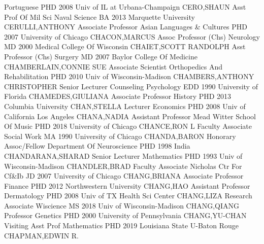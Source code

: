 \documentclass[
]{article}
\begin{document}
Portuguese \textbar{}  \textbar PHD 2008 Univ of IL at
Urbana-Champaign \textbar CERO,SHAUN \textbar Asst Prof Of Mil Sci
\textbar Naval Science \textbar{}  \textbar BA 2013 Marquette
University \textbar CERULLI,ANTHONY \textbar Associate Professor
\textbar Asian Languages \& Cultures \textbar{}  \textbar PHD
2007 University of Chicago \textbar CHACON,MARCUS \textbar Assoc
Professor (Chs) \textbar Neurology \textbar{}  \textbar MD
2000 Medical College Of Wisconsin \textbar CHAIET,SCOTT RANDOLPH
\textbar Asst Professor (Chs) \textbar Surgery \textbar{} 
\textbar MD 2007 Baylor College Of Medicine \textbar CHAMBERLAIN,CONNIE
SUE \textbar Associate Scientist \textbar Orthopedics And Rehabilitation
\textbar{}  \textbar PHD 2010 Univ of Wisconsin-Madison
\textbar CHAMBERS,ANTHONY CHRISTOPHER \textbar Senior Lecturer
\textbar Counseling Psychology \textbar{}  \textbar EDD 1990
University of Florida \textbar CHAMEDES,GIULIANA \textbar Associate
Professor \textbar History \textbar{}  \textbar PHD 2013
Columbia University \textbar CHAN,STELLA \textbar Lecturer
\textbar Economics \textbar{}  \textbar PHD 2008 Univ of
California Los Angeles \textbar CHANA,NADIA \textbar Assistant Professor
\textbar Mead Witter School Of Music \textbar{}  \textbar PHD
2018 University of Chicago \textbar CHANCE,RON L \textbar Faculty
Associate \textbar Social Work \textbar{}  \textbar MA 1990
University of Chicago \textbar CHANDA,BARON \textbar Honorary
Assoc/Fellow \textbar Department Of Neuroscience \textbar{} 
\textbar PHD 1998 India \textbar CHANDARANA,SHARAD \textbar Senior
Lecturer \textbar Mathematics \textbar{}  \textbar PHD 1993
Univ of Wisconsin-Madison \textbar CHANDLER,BRAD \textbar Faculty
Associate \textbar Nicholas Ctr For Cf\&Ib \textbar{} 
\textbar JD 2007 University of Chicago \textbar CHANG,BRIANA
\textbar Associate Professor \textbar Finance \textbar{} 
\textbar PHD 2012 Northwestern University \textbar CHANG,HAO
\textbar Assistant Professor \textbar Dermatology \textbar{} 
\textbar PHD 2008 Univ of TX Health Sci Center \textbar CHANG,LIZA
\textbar Research Associate \textbar Wiscience \textbar{} 
\textbar MS 2018 Univ of Wisconsin-Madison \textbar CHANG,QIANG
\textbar Professor \textbar Genetics \textbar{}  \textbar PHD
2000 University of Pennsylvania \textbar CHANG,YU-CHAN \textbar Visiting
Asst Prof \textbar Mathematics \textbar{}  \textbar PHD 2019
Louisiana State U-Baton Rouge \textbar CHAPMAN,EDWIN R.
\end{document}
